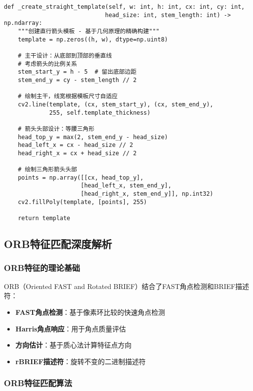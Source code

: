 \documentclass[12pt]{article}
\begin{document}
\begin{lstlisting}[caption=直行箭头模板创建]
def _create_straight_template(self, w: int, h: int, cx: int, cy: int, 
                             head_size: int, stem_length: int) -> np.ndarray:
    """创建直行箭头模板 - 基于几何原理的精确构建"""
    template = np.zeros((h, w), dtype=np.uint8)
    
    # 主干设计：从底部到顶部的垂直线
    # 考虑箭头的比例关系
    stem_start_y = h - 5  # 留出底部边距
    stem_end_y = cy - stem_length // 2
    
    # 绘制主干，线宽根据模板尺寸自适应
    cv2.line(template, (cx, stem_start_y), (cx, stem_end_y), 
             255, self.template_thickness)
    
    # 箭头头部设计：等腰三角形
    head_top_y = max(2, stem_end_y - head_size)
    head_left_x = cx - head_size // 2
    head_right_x = cx + head_size // 2
    
    # 绘制三角形箭头头部
    points = np.array([[cx, head_top_y], 
                      [head_left_x, stem_end_y], 
                      [head_right_x, stem_end_y]], np.int32)
    cv2.fillPoly(template, [points], 255)
    
    return template
\end{lstlisting}

\subsection{ORB特征匹配深度解析}

\subsubsection{ORB特征的理论基础}

ORB（Oriented FAST and Rotated BRIEF）结合了FAST角点检测和BRIEF描述符：

\begin{itemize}
    \item \textbf{FAST角点检测}：基于像素环比较的快速角点检测
    \item \textbf{Harris角点响应}：用于角点质量评估
    \item \textbf{方向估计}：基于质心法计算特征点方向
    \item \textbf{rBRIEF描述符}：旋转不变的二进制描述符
\end{itemize}

\subsubsection{ORB特征匹配算法}
\end{document}
